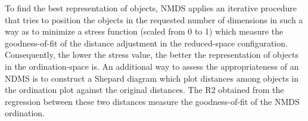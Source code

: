 \documentclass[
]{book}
\newenvironment{Shaded}{\begin{snugshade}}{\end{snugshade}}
\newcommand{\AttributeTok}[1]{\textcolor[rgb]{0.77,0.63,0.00}{#1}}
\newcommand{\CommentTok}[1]{\textcolor[rgb]{0.56,0.35,0.01}{\textit{#1}}}
\newcommand{\DecValTok}[1]{\textcolor[rgb]{0.00,0.00,0.81}{#1}}
\newcommand{\DocumentationTok}[1]{\textcolor[rgb]{0.56,0.35,0.01}{\textbf{\textit{#1}}}}
\newcommand{\FunctionTok}[1]{\textcolor[rgb]{0.00,0.00,0.00}{#1}}
\newcommand{\NormalTok}[1]{#1}
\newcommand{\OtherTok}[1]{\textcolor[rgb]{0.56,0.35,0.01}{#1}}
\newcommand{\SpecialCharTok}[1]{\textcolor[rgb]{0.00,0.00,0.00}{#1}}
\newcommand{\StringTok}[1]{\textcolor[rgb]{0.31,0.60,0.02}{#1}}
\begin{document}
To find the best representation of objects, NMDS applies an iterative
procedure that tries to position the objects in the requested number of
dimensions in such a way as to minimize a stress function (scaled from 0
to 1) which measure the goodness-of-fit of the distance adjustment in
the reduced-space configuration. Consequently, the lower the stress
value, the better the representation of objects in the ordination-space
is. An additional way to assess the appropriateness of an NDMS is to
construct a Shepard diagram which plot distances among objects in the
ordination plot against the original distances. The R2 obtained from the
regression between these two distances measure the goodness-of-fit of
the NMDS ordination.

\begin{Shaded}
\end{Shaded}
\end{document}
